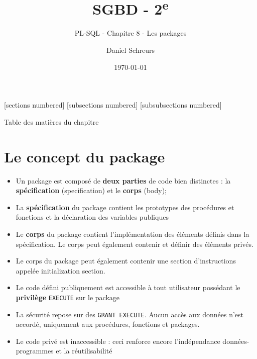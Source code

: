 \documentclass[10pt]{beamer}
\title{SGBD - 2\textsuperscript{e}}
\subtitle{PL-SQL - Chapitre 8 - Les packages}
\date{\today}
\author{Daniel Schreurs}
\institute{Haute École de la Province de Liège}
\begin{document}
\maketitle

[sections numbered]
[subsections numbered]
[subsubsections numbered]
\begin{frame}[allowframebreaks]{Table des matières du chapitre}
    \tableofcontents[subsectionstyle=show/show/hide,subsubsectionstyle=show/show/hide,]
\end{frame}

\section{Le concept du package}

\begin{frame}{\secname}
    \begin{itemize}
        \item Un package est composé de \textbf{deux parties} de code bien distinctes : la \textbf{spécification} (specification) et le \textbf{corps} (body);
        \item La \textbf{spécification} du package contient les prototypes des procédures et fonctions et la déclaration des variables publiques
        \item Le \textbf{corps} du package contient l'implémentation des éléments définis dans la spécification.  Le corps peut également contenir et définir des éléments privés.
        \item Le corps du package peut également contenir une section d'instructions appelée initialization section.
    \end{itemize}
\end{frame}

\begin{frame}{\secname}
    \begin{itemize}
        \item Le code défini publiquement est accessible à tout utilisateur possédant le \textbf{privilège} \lstinline[language=plsql]!EXECUTE! sur le package
        \item La sécurité repose sur des \lstinline[language=plsql]!GRANT EXECUTE!. Aucun accès aux données n'est accordé, uniquement aux procédures, fonctions et packages.
        \item Le code privé est inaccessible : ceci renforce encore l'indépendance données-programmes et la réutilisabilité
    \end{itemize}
\end{frame}
\end{document}
